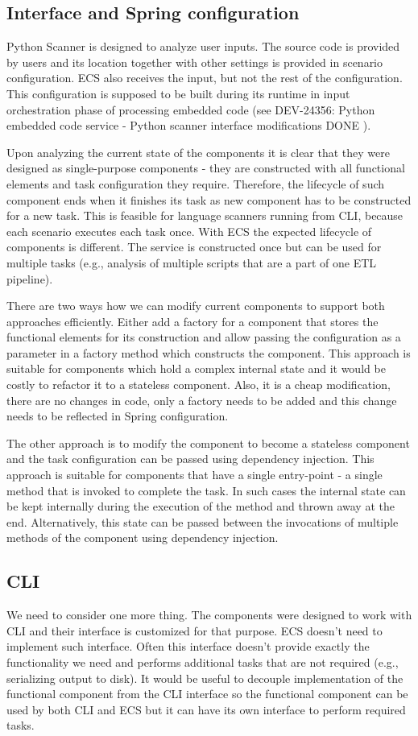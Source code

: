 \subsection{Interface and Spring configuration}
Python Scanner is designed to analyze user inputs. The source code is provided by users and its location together with other settings is provided in scenario configuration. ECS also receives the input, but not the rest of the configuration. This configuration is supposed to be built during its runtime in input orchestration phase of processing embedded code (see DEV-24356: Python embedded code service - Python scanner interface modifications
DONE
). 
\par
Upon analyzing the current state of the components it is clear that they were designed as single-purpose components - they are constructed with all functional elements and task configuration they require. Therefore, the lifecycle of such component ends when it finishes its task as new component has to be constructed for a new task. This is feasible for language scanners running from CLI, because each scenario executes each task once. With ECS the expected lifecycle of components is different. The service is constructed once but can be used for multiple tasks (e.g., analysis of multiple scripts that are a part of one ETL pipeline).
\par
There are two ways how we can modify current components to support both approaches efficiently. Either add a factory for a component that stores the functional elements for its construction and allow passing the configuration as a parameter in a factory method which constructs the component. This approach is suitable for components which hold a complex internal state and it would be costly to refactor it to a stateless component. Also, it is a cheap modification, there are no changes in code, only a factory needs to be added and this change needs to be reflected in Spring configuration.
\par
The other approach is to modify the component to become a stateless component and the task configuration can be passed using dependency injection. This approach is suitable for components that have a single entry-point - a single method that is invoked to complete the task. In such cases the internal state can be kept internally during the execution of the method and thrown away at the end. Alternatively, this state can be passed between the invocations of multiple methods of the component using dependency injection.

\subsection{CLI}
We need to consider one more thing. The components were designed to work with CLI and their interface is customized for that purpose. ECS doesn’t need to implement such interface. Often this interface doesn’t provide exactly the functionality we need and performs additional tasks that are not required (e.g., serializing output to disk). It would be useful to decouple implementation of the functional component from the CLI interface so the functional component can be used by both CLI and ECS but it can have its own interface to perform required tasks.

